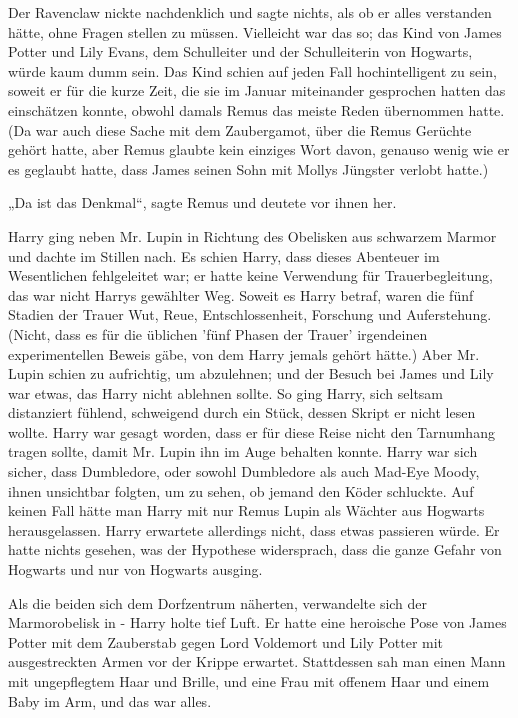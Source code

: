 {Der Ravenclaw nickte nachdenklich und sagte nichts, als ob er alles verstanden hätte, ohne Fragen stellen zu müssen. Vielleicht war das so; das Kind von James Potter und Lily Evans, dem Schulleiter und der Schulleiterin von Hogwarts, würde kaum dumm sein. Das Kind schien auf jeden Fall hochintelligent zu sein, soweit er für die kurze Zeit, die sie im Januar miteinander gesprochen hatten das einschätzen konnte, obwohl damals Remus das meiste Reden übernommen hatte. (Da war auch diese Sache mit dem Zaubergamot, über die Remus Gerüchte gehört hatte, aber Remus glaubte kein einziges Wort davon, genauso wenig wie er es geglaubt hatte, dass James seinen Sohn mit Mollys Jüngster verlobt hatte.)

„Da ist das Denkmal“, sagte Remus und deutete vor ihnen her.

Harry ging neben Mr. Lupin in Richtung des Obelisken aus schwarzem Marmor und dachte im Stillen nach. Es schien Harry, dass dieses Abenteuer im Wesentlichen fehlgeleitet war; er hatte keine Verwendung für Trauerbegleitung, das war nicht Harrys gewählter Weg. Soweit es Harry betraf, waren die fünf Stadien der Trauer Wut, Reue, Entschlossenheit, Forschung und Auferstehung. (Nicht, dass es für die üblichen 'fünf Phasen der Trauer' irgendeinen experimentellen Beweis gäbe, von dem Harry jemals gehört hätte.) Aber Mr. Lupin schien zu aufrichtig, um abzulehnen; und der Besuch bei James und Lily war etwas, das Harry nicht ablehnen sollte. So ging Harry, sich seltsam distanziert fühlend, schweigend durch ein Stück, dessen Skript er nicht lesen wollte. Harry war gesagt worden, dass er für diese Reise nicht den Tarnumhang tragen sollte, damit Mr. Lupin ihn im Auge behalten konnte. Harry war sich sicher, dass Dumbledore, oder sowohl Dumbledore als auch Mad-Eye Moody, ihnen unsichtbar folgten, um zu sehen, ob jemand den Köder schluckte. Auf keinen Fall hätte man Harry mit nur Remus Lupin als Wächter aus Hogwarts herausgelassen. Harry erwartete allerdings nicht, dass etwas passieren würde. Er hatte nichts gesehen, was der Hypothese widersprach, dass die ganze Gefahr von Hogwarts und nur von Hogwarts ausging.

Als die beiden sich dem Dorfzentrum näherten, verwandelte sich der Marmorobelisk in - Harry holte tief Luft. Er hatte eine heroische Pose von James Potter mit dem Zauberstab gegen Lord Voldemort und Lily Potter mit ausgestreckten Armen vor der Krippe erwartet. Stattdessen sah man einen Mann mit ungepflegtem Haar und Brille, und eine Frau mit offenem Haar und einem Baby im Arm, und das war alles.

}
